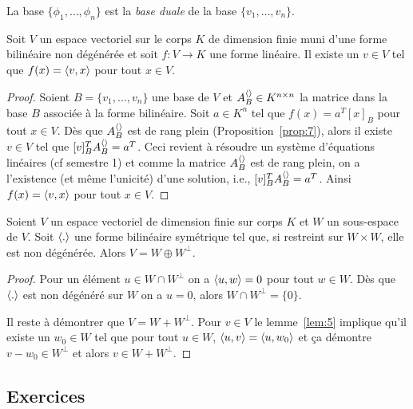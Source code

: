 \begin{definition}
  \label{def:14}
  La base $\{\phi_1,\dots,\phi_n\}$ est la \emph{base duale} de la base $\{v_1,\dots,v_n\}$. 
\end{definition}




\begin{lemma}
  \label{lem:5}
  Soit $V$
  un espace vectoriel sur le corps $K$
  de dimension finie muni d'une forme bilinéaire  non dégénérée et soit
  $f\colon V \longrightarrow K$
  une forme linéaire. Il existe un $v \in V$
  tel que $f(x) = \langle {v,x} \rangle$ pour tout $x \in V$.
\end{lemma}

\begin{proof}
  Soient $B = \{v_1,\dots,v_n\}$ une base  de $V$ et $A_B^{\langle {} \rangle} \in K^{n\times n}$ la matrice dans la base $B$ associée à la forme bilinéaire. Soit $a \in K^n$ tel que  $f(x) = a^T[x]_B$ pour tout $x \in V$. Dès que $A_B^{\langle {} \rangle}$ est de rang plein (Proposition~\ref{prop:7}), alors il existe $v \in V$ tel que $[v]_B^TA_B^{\langle {} \rangle} = a^T$. Ceci revient à résoudre un système d'équations linéaires (cf semestre 1) et comme la matrice $A_B^{\langle {} \rangle}$ est de rang plein, on a l'existence (et même l'unicité) d'une solution, i.e.,  $[v]_B^TA_B^{\langle {} \rangle} = a^T$. Ainsi 
$f(x) = \langle {v,x} \rangle$ pour tout $x \in V$. 
\end{proof}




\begin{theorem}
  \label{thr:8}
  Soient $V$ un espace vectoriel de dimension finie sur corps $K$ et $W$ un sous-espace de $V$. Soit $\langle {.} \rangle$ une forme bilinéaire symétrique tel que, si restreint sur $W\times W$, elle est non dégénérée. Alors $V = W \oplus W^\perp$.  
\end{theorem}

\begin{proof}
  Pour un élément $u \in W \cap W^\perp$ on a $\langle {u,w} \rangle = 0$ pour tout $w \in W$. Dès que $\langle {.} \rangle$ est non dégénéré sur $W$ on a $u=0$, alors $W \cap W^\perp = \{0\}$. 

Il reste à démontrer que $V = W + W^\perp$. Pour $v \in V$ le lemme~\ref{lem:5} implique qu'il existe un $w_0 \in W$ tel que pour tout $u \in W$,  $\langle {u,v} \rangle = \langle {u,w_0} \rangle$ et ça démontre   $v - w_0 \in W^\perp$ et alors $v \in W + W^\perp$. 
\end{proof}

\subsection*{Exercices} 

